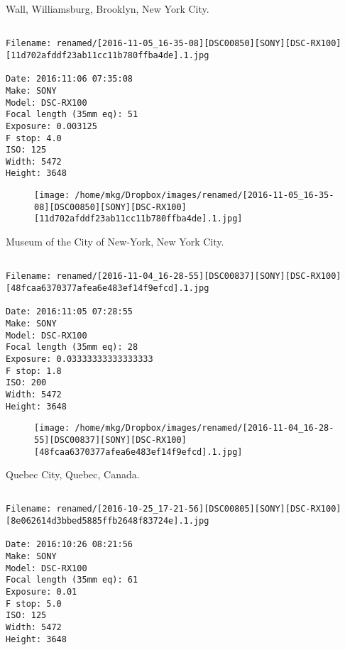 \clearpage
\onecolumn
\noindent Wall, Williamsburg, Brooklyn, New York City.
\noindent
\begin{lstlisting}

Filename: renamed/[2016-11-05_16-35-08][DSC00850][SONY][DSC-RX100][11d702afddf23ab11cc11b780ffba4de].1.jpg

Date: 2016:11:06 07:35:08
Make: SONY
Model: DSC-RX100
Focal length (35mm eq): 51
Exposure: 0.003125
F stop: 4.0
ISO: 125
Width: 5472
Height: 3648
\end{lstlisting}
\clearpage

\begin{figure}
\texttt{[image: /home/mkg/Dropbox/images/renamed/[2016-11-05\_16-35-08][DSC00850][SONY][DSC-RX100][11d702afddf23ab11cc11b780ffba4de].1.jpg]}
\end{figure}
    
\clearpage
\onecolumn
\noindent Museum of the City of New-York, New York City.
\noindent
\begin{lstlisting}

Filename: renamed/[2016-11-04_16-28-55][DSC00837][SONY][DSC-RX100][48fcaa6370377afea6e483ef14f9efcd].1.jpg

Date: 2016:11:05 07:28:55
Make: SONY
Model: DSC-RX100
Focal length (35mm eq): 28
Exposure: 0.03333333333333333
F stop: 1.8
ISO: 200
Width: 5472
Height: 3648
\end{lstlisting}
\clearpage

\begin{figure}
\texttt{[image: /home/mkg/Dropbox/images/renamed/[2016-11-04\_16-28-55][DSC00837][SONY][DSC-RX100][48fcaa6370377afea6e483ef14f9efcd].1.jpg]}
\end{figure}
    
\clearpage
\onecolumn
\noindent Quebec City, Quebec, Canada.
\noindent
\begin{lstlisting}

Filename: renamed/[2016-10-25_17-21-56][DSC00805][SONY][DSC-RX100][8e062614d3bbed5885ffb2648f83724e].1.jpg

Date: 2016:10:26 08:21:56
Make: SONY
Model: DSC-RX100
Focal length (35mm eq): 61
Exposure: 0.01
F stop: 5.0
ISO: 125
Width: 5472
Height: 3648
\end{lstlisting}
\clearpage

